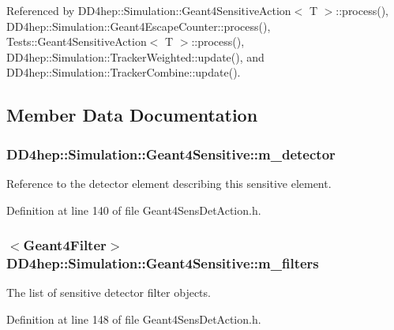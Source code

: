 Referenced by DD4hep::Simulation::Geant4SensitiveAction$<$ T $>$::process(), DD4hep::Simulation::Geant4EscapeCounter::process(), Tests::Geant4SensitiveAction$<$ T $>$::process(), DD4hep::Simulation::TrackerWeighted::update(), and DD4hep::Simulation::TrackerCombine::update().

\subsection{Member Data Documentation}
\hypertarget{class_d_d4hep_1_1_simulation_1_1_geant4_sensitive_a8b5b7e0dff9d8fcb154b646e1618821f}{
\subsubsection[{m\_\-detector}]{ {\bf DD4hep::Simulation::Geant4Sensitive::m\_\-detector}}}
\label{class_d_d4hep_1_1_simulation_1_1_geant4_sensitive_a8b5b7e0dff9d8fcb154b646e1618821f}


Reference to the detector element describing this sensitive element. 

Definition at line 140 of file Geant4SensDetAction.h.\hypertarget{class_d_d4hep_1_1_simulation_1_1_geant4_sensitive_a7486440af0fb52c3ab233544262d2c95}{
\subsubsection[{m\_\-filters}]{$<${\bf Geant4Filter}$>$ {\bf DD4hep::Simulation::Geant4Sensitive::m\_\-filters}}}
\label{class_d_d4hep_1_1_simulation_1_1_geant4_sensitive_a7486440af0fb52c3ab233544262d2c95}


The list of sensitive detector filter objects. 

Definition at line 148 of file Geant4SensDetAction.h.

